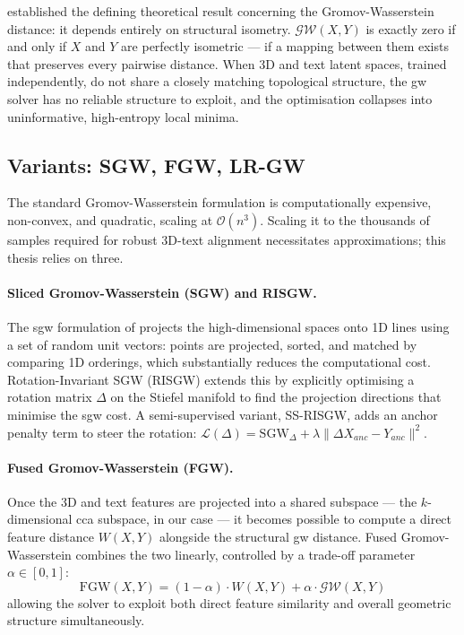 \textcite{vayer2019optimal} established the defining theoretical result concerning the Gromov-Wasserstein distance: it depends entirely on structural isometry. $\mathcal{GW}(X, Y)$ is exactly zero if and only if $X$ and $Y$ are perfectly isometric --- if a mapping between them exists that preserves every pairwise distance. When 3D and text latent spaces, trained independently, do not share a closely matching topological structure, the \gls{gw} solver has no reliable structure to exploit, and the optimisation collapses into uninformative, high-entropy local minima.

\subsection{Variants: SGW, FGW, LR-GW}
\label{subsec:gw_variants}

The standard Gromov-Wasserstein formulation is computationally expensive, non-convex, and quadratic, scaling at $\mathcal{O}(n^3)$. Scaling it to the thousands of samples required for robust 3D-text alignment necessitates approximations; this thesis relies on three.

\paragraph{Sliced Gromov-Wasserstein (SGW) and RISGW.}
The \gls{sgw} formulation of \textcite{vayer2019optimal} projects the high-dimensional spaces onto 1D lines using a set of random unit vectors: points are projected, sorted, and matched by comparing 1D orderings, which substantially reduces the computational cost. Rotation-Invariant SGW (RISGW) extends this by explicitly optimising a rotation matrix $\Delta$ on the Stiefel manifold to find the projection directions that minimise the \gls{sgw} cost. A semi-supervised variant, SS-RISGW, adds an anchor penalty term to steer the rotation: $\mathcal{L}(\Delta) = \mathrm{SGW}_{\Delta} + \lambda \|\Delta X_{anc} - Y_{anc}\|^2$.

\paragraph{Fused Gromov-Wasserstein (FGW).}
Once the 3D and text features are projected into a shared subspace --- the $k$-dimensional \gls{cca} subspace, in our case --- it becomes possible to compute a direct feature distance $W(X,Y)$ alongside the structural \gls{gw} distance. Fused Gromov-Wasserstein combines the two linearly, controlled by a trade-off parameter $\alpha \in [0,1]$:
\begin{equation}
    \mathrm{FGW}(X, Y) = (1 - \alpha) \cdot W(X, Y) + \alpha \cdot \mathcal{GW}(X, Y)
\end{equation}
allowing the solver to exploit both direct feature similarity and overall geometric structure simultaneously.

